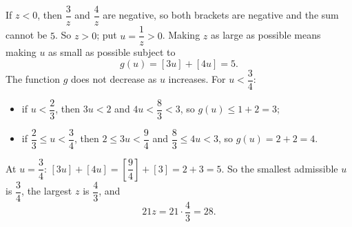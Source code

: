 If $z<0$, then $\dfrac3z$ and $\dfrac4z$ are negative, so both brackets are negative and the sum cannot be $5$. So $z>0$; put $u=\dfrac1z>0$. Making $z$ as large as possible means making $u$ as small as possible subject to
\[g(u)=[3u]+[4u]=5.\]
The function $g$ does not decrease as $u$ increases. For $u<\dfrac34$:
\begin{itemize}
\item if $u<\dfrac23$, then $3u<2$ and $4u<\dfrac83<3$, so $g(u)\le1+2=3$;
\item if $\dfrac23\le u<\dfrac34$, then $2\le3u<\dfrac94$ and $\dfrac83\le4u<3$, so $g(u)=2+2=4$.
\end{itemize}
At $u=\dfrac34$: $[3u]+[4u]=\left[\dfrac94\right]+[3]=2+3=5$. So the smallest admissible $u$ is $\dfrac34$, the largest $z$ is $\dfrac43$, and
\[21z=21\cdot\dfrac43=\boxed{28}.\]
